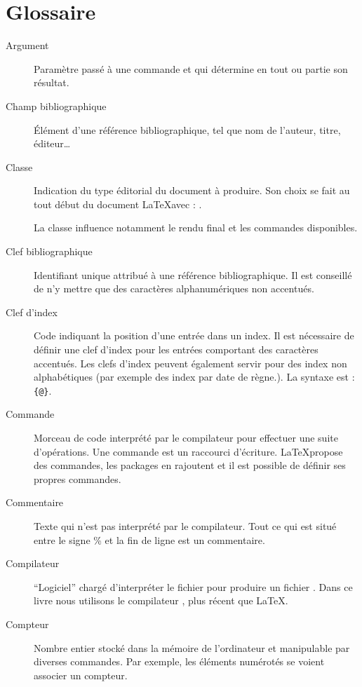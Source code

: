 \chapter{Glossaire}


\begin{description}
\item[Argument] Paramètre passé à une commande et qui détermine en tout ou partie son résultat.


\item[Champ bibliographique] Élément d'une référence bibliographique, tel que nom de l'auteur, titre, éditeur…


\item[Classe] Indication du type éditorial du document à produire. Son choix se fait au tout début du document \LaTeX avec : . 

La classe influence notamment le rendu final et les commandes disponibles.

\item[Clef bibliographique] Identifiant unique attribué à une référence bibliographique. Il est conseillé de n'y mettre que des caractères alphanumériques non accentués.

\item[Clef d'index] Code indiquant la position d'une entrée dans un index. Il est nécessaire de définir une clef d'index pour les entrées comportant des caractères accentués. Les clefs d'index peuvent également servir pour des index non alphabétiques (par exemple des index par date de règne.). La syntaxe est : \verb|{|\verb|@|\verb|}|.

\item[Commande] Morceau de code  interprété par le compilateur pour effectuer une suite d'opérations. Une commande est un raccourci d'écriture. \LaTeX propose des commandes, les packages en rajoutent et il est possible de définir ses propres commandes.

\item[Commentaire] Texte qui n'est pas interprété par le compilateur. Tout ce qui est situé entre le signe \% et la fin de ligne est un commentaire.

\item[Compilateur] \enquote{Logiciel} chargé d'interpréter le fichier  pour produire un fichier . Dans ce livre nous utilisons le compilateur \XeLaTeX, plus récent que \LaTeX.

\item[Compteur] Nombre entier stocké dans la mémoire de l'ordinateur et manipulable par diverses commandes. Par exemple, les éléments numérotés se voient associer un compteur.



\end{description}

